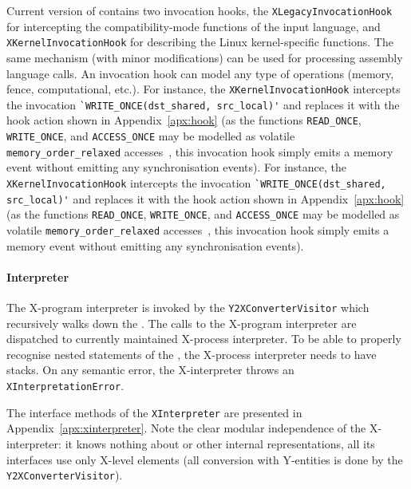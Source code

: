 Current version of \porthos[2] contains two invocation hooks, the \texttt{XLegacyInvocationHook} for intercepting the compatibility-mode functions of the \porthos[2] input language, and \texttt{XKernelInvocationHook} for describing the Linux kernel-specific functions.
The same mechanism (with minor modifications) can be used for processing assembly language calls.
An invocation hook can model any type of operations (memory, fence, computational, etc.).
For instance, the \texttt{XKernelInvocationHook} intercepts the invocation \lstinline{`WRITE_ONCE(dst_shared, src_local)'} and replaces it with the hook action shown in Appendix~\ref{apx:hook} (as the functions \lstinline{READ_ONCE}, \lstinline{WRITE_ONCE}, and \lstinline{ACCESS_ONCE} may be modelled as volatile \lstinline{memory_order_relaxed} accesses~\cite{kernel2c}, this invocation hook simply emits a memory event without emitting any synchronisation events).
For instance, the \texttt{XKernelInvocationHook} intercepts the invocation \lstinline{`WRITE_ONCE(dst_shared, src_local)'} and replaces it with the hook action shown in Appendix~\ref{apx:hook} (as the functions \lstinline{READ_ONCE}, \lstinline{WRITE_ONCE}, and \lstinline{ACCESS_ONCE} may be modelled as volatile \lstinline{memory_order_relaxed} accesses~\cite{kernel2c}, this invocation hook simply emits a memory event without emitting any synchronisation events).


\paragraph{Interpreter}

The X-program interpreter is invoked by the \texttt{Y2XConverterVisitor} which recursively walks down the \ytree{}.
The calls to the X-program interpreter are dispatched to currently maintained X-process interpreter.
To be able to properly recognise nested statements of the \ytree{}, the X-process interpreter needs to have stacks.
On any semantic error, the X-interpreter throws an \texttt{XInterpretationError}.

The interface methods of the \texttt{XInterpreter} are presented in Appendix~\ref{apx:xinterpreter}.
Note the clear modular independence of the X-interpreter: it knows nothing about \ytree{} or other internal representations, all its interfaces use only X-level elements (all conversion with Y-entities is done by the \texttt{Y2XConverterVisitor}).

